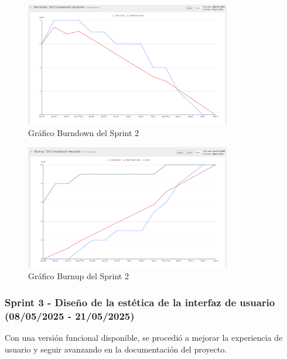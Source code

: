 \begin{figure}[H]
\centering
\includegraphics[width=0.8\textwidth]{img/BurndownS2.png}
\caption{Gráfico Burndown del Sprint 2}
\label{fig:BurndownS2}
\end{figure}

\begin{figure}[H]
\centering
\includegraphics[width=0.8\textwidth]{img/BurnupS2.png}
\caption{Gráfico Burnup del Sprint 2}
\label{fig:BurnupS2}
\end{figure}

\subsubsection{Sprint 3 - Diseño de la estética de la interfaz de usuario (08/05/2025 - 21/05/2025)}

Con una versión funcional disponible, se procedió a mejorar la experiencia de usuario y seguir avanzando en la documentación del proyecto.

